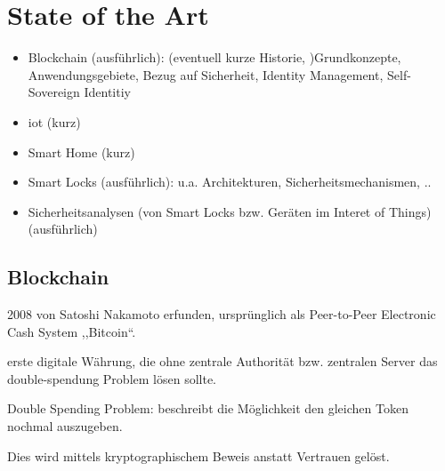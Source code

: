 \section{State of the Art}
    \begin{itemize}
        \item Blockchain (ausführlich): (eventuell kurze Historie, )Grundkonzepte, Anwendungsgebiete, Bezug auf Sicherheit, Identity Management, Self-Sovereign Identitiy
        \item \gls{iot} (kurz)
        \item Smart Home (kurz)
        \item Smart Locks (ausführlich): u.a. Architekturen, Sicherheitsmechanismen, ..
        \item Sicherheitsanalysen (von Smart Locks bzw. Geräten im Interet of Things) (ausführlich)
    \end{itemize}
    
    
\subsection{Blockchain}
    2008 von Satoshi Nakamoto erfunden, ursprünglich als Peer-to-Peer Electronic Cash System ,,Bitcoin``.
    
    erste digitale Währung, die 
    ohne zentrale Authorität bzw. zentralen Server das double-spendung Problem lösen sollte\cite{Nakamoto2008}. 
    
    Double Spending Problem: beschreibt die Möglichkeit den gleichen Token nochmal auszugeben.
    
    Dies wird mittels kryptographischem Beweis anstatt Vertrauen gelöst.